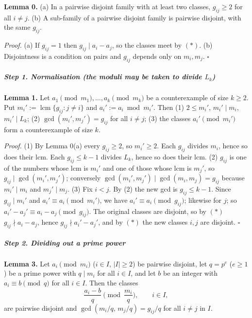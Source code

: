 \textbf{Lemma 0.} (a) In a pairwise disjoint family with at least two
classes, \(g_{ij}\ge2\) for all \(i\ne j\). (b) A sub-family of a
pairwise disjoint family is pairwise disjoint, with the same \(g_{ij}\).

\emph{Proof.} (a) If \(g_{ij}=1\) then \(g_{ij}\mid a_i-a_j\), so the
classes meet by \((*)\). (b) Disjointness is a condition on pairs and
\(g_{ij}\) depends only on \(m_i,m_j\). \(\square\)

\subparagraph{\texorpdfstring{Step 1. Normalisation (the moduli may be
taken to divide
\(L_k\))}{Step 1. Normalisation (the moduli may be taken to divide L\_k)}}\label{step-1.-normalisation-the-moduli-may-be-taken-to-divide-l_k}

\textbf{Lemma 1.} Let \(a_1\pmod{m_1},\dots,a_k\pmod{m_k}\) be a
counterexample of size \(k\ge2\). Put
\(m_i':=\operatorname{lcm}\{g_{ij}: j\ne i\}\) and
\(a_i':=a_i \bmod m_i'\). Then (1) \(2\le m_i'\), \(m_i'\mid m_i\),
\(m_i'\mid L_k\); (2) \(\gcd(m_i',m_j')=g_{ij}\) for all \(i\ne j\); (3)
the classes \(a_i'\pmod{m_i'}\) form a counterexample of size \(k\).

\emph{Proof.} (1) By Lemma 0(a) every \(g_{ij}\ge2\), so \(m_i'\ge2\).
Each \(g_{ij}\) divides \(m_i\), hence so does their lcm. Each
\(g_{ij}\le k-1\) divides \(L_k\), hence so does their lcm. (2)
\(g_{ij}\) is one of the numbers whose lcm is \(m_i'\) and one of those
whose lcm is \(m_j'\), so \(g_{ij}\mid\gcd(m_i',m_j')\); conversely
\(\gcd(m_i',m_j')\mid\gcd(m_i,m_j)=g_{ij}\) because \(m_i'\mid m_i\) and
\(m_j'\mid m_j\). (3) Fix \(i<j\). By (2) the new gcd is
\(g_{ij}\le k-1\). Since \(g_{ij}\mid m_i'\) and
\(a_i'\equiv a_i\pmod{m_i'}\), we have \(a_i'\equiv a_i\pmod{g_{ij}}\);
likewise for \(j\); so \(a_i'-a_j'\equiv a_i-a_j\pmod{g_{ij}}\). The
original classes are disjoint, so by \((*)\) \(g_{ij}\nmid a_i-a_j\),
hence \(g_{ij}\nmid a_i'-a_j'\), and by \((*)\) the new classes \(i,j\)
are disjoint. \(\square\)

\subparagraph{Step 2. Dividing out a prime
power}\label{step-2.-dividing-out-a-prime-power}

\textbf{Lemma 3.} Let \(a_i\pmod{m_i}\) (\(i\in I\), \(|I|\ge2\)) be
pairwise disjoint, let \(q=p^e\) (\(e\ge1\)) be a prime power with
\(q\mid m_i\) for all \(i\in I\), and let \(b\) be an integer with
\(a_i\equiv b\pmod q\) for all \(i\in I\). Then the classes
\[\frac{a_i-b}{q}\pmod{\frac{m_i}{q}},\qquad i\in I,\] are pairwise
disjoint and \(\gcd(m_i/q,\,m_j/q)=g_{ij}/q\) for all \(i\ne j\) in
\(I\).

